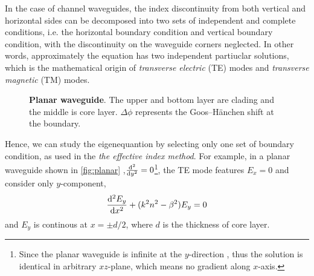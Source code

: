 \documentclass[final]{kuee_en}
\begin{document}
In the case of channel waveguides, the index discontinuity from both vertical and horizontal sides can be decomposed into two sets of independent and complete conditions, i.e. the horizontal boundary condition and vertical boundary condition, with the discontinuity on the waveguide corners neglected. In other words, approximately the equation has two independent partiuclar solutions, which is the mathematical origin of \textit{ transverse electric} (TE) modes and \textit{transverse magnetic} (TM) modes.

\begin{figure}
\centering
{}
\caption{\textbf{Planar waveguide}. The upper and bottom layer are clading and the middle is core layer. $\Delta \phi$ represents the Goos–H\"{a}nchen shift at the boundary.}
\label{fig:planar}
\end{figure}

Hence, we can study the eigenequantion by selecting only one set of boundary condition, as used in the \textit{the effective index method}. For example, in a planar waveguide shown in \autoref{fig:planar} ,$\dv[2]{}{y}=0$\footnote{Since the planar waveguide is infinite at the $y$-direction , thus the solution is identical in arbitrary $xz$-plane, which means no gradient along $x$-axis.},
the TE mode features $E_x=0$ and consider only $y$-component, 
\begin{equation}
    \dv[2]{E_y}{x} + (k^2 n^2 - \beta^2)E_y =0
\end{equation}
and $E_y$ is continous at $x=\pm d/2$, where $d$ is the thickness of core layer.
\end{document}

